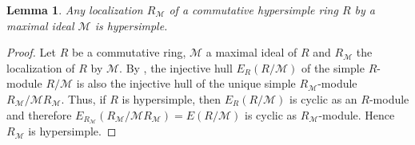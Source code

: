 \documentclass{amsart}
\theoremstyle{plain}
\newtheorem{lemma}[theorem]{Lemma}
\numberwithin{equation}{section}
\begin{document}
\begin{lemma}
Any localization $R_{\mathcal{M}}$ of a commutative hypersimple ring $R$ by a maximal ideal $\mathcal{M}$ is hypersimple. 
\end{lemma}


\begin{proof}
Let $R$ be a commutative ring, $\mathcal{M}$ a maximal ideal of $R$ and $R_{\mathcal{M}}$ the localization of $R$ by $\mathcal{M}$. By \cite[Proposition
5.6]{SV}, the injective hull $E_{R} (R/\mathcal{M})$ of the simple $R$-module $R/\mathcal{M}$ is also the injective hull of the unique simple $R_{\mathcal{M}}$-module $R_{\mathcal{M}}/\mathcal{M} R_{\mathcal{M}}$. Thus, if $R$ is hypersimple, then $E_{R} (R/\mathcal{M})$ is cyclic as an $R$-module and therefore $E_{R_{\mathcal{M}}} (R_{\mathcal{M}}/\mathcal{M} R_{\mathcal{M}}) =E (R/\mathcal{M})$ is cyclic as $R_{\mathcal{M}}$-module. Hence $R_{\mathcal{M}}$ is hypersimple. 
\end{proof}

%
%
%
%
\end{document}
